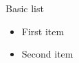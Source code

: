 \documentclass[14pt,t]{beamer-accessibility}
\begin{document}
\begin{frame}{Basic list}
\begin{itemize}
\item First item
\item Second item
\end{itemize}
\end{frame}
\end{document}
